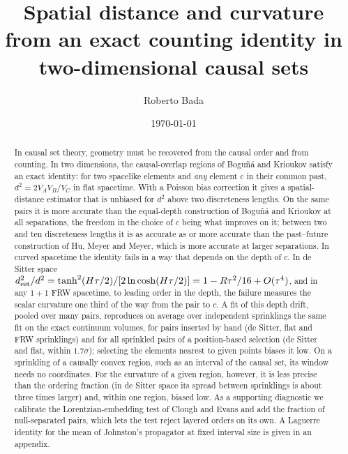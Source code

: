 \documentclass[prd,twocolumn,superscriptaddress,nofootinbib,amsmath,amssymb,floatfix]{revtex4-2}
\begin{document}
\title{Spatial distance and curvature from an exact counting identity in two-dimensional causal sets}

\author{Roberto Bada}

\date{\today}

\begin{abstract}
In causal set theory, geometry must be recovered from the causal order and from counting. In two dimensions, the causal-overlap regions of Bogu\~n\'a and Krioukov satisfy an exact identity: for two spacelike elements and \emph{any} element $c$ in their common past, $d^2=2V_AV_B/V_C$ in flat spacetime. With a Poisson bias correction it gives a spatial-distance estimator that is unbiased for $d^2$ above two discreteness lengths. On the same pairs it is more accurate than the equal-depth construction of Bogu\~n\'a and Krioukov at all separations, the freedom in the choice of $c$ being what improves on it; between two and ten discreteness lengths it is as accurate as or more accurate than the past--future construction of Hu, Meyer and Meyer, which is more accurate at larger separations. In curved spacetime the identity fails in a way that depends on the depth of $c$. In de Sitter space $d^2_{\rm est}/d^2=\tanh^2(H\tau/2)/[2\ln\cosh(H\tau/2)]=1-R\tau^2/16+O(\tau^4)$, and in any $1+1$ FRW spacetime, to leading order in the depth, the failure measures the scalar curvature one third of the way from the pair to $c$. A fit of this depth drift, pooled over many pairs, reproduces on average over independent sprinklings the same fit on the exact continuum volumes, for pairs inserted by hand (de Sitter, flat and FRW sprinklings) and for all sprinkled pairs of a position-based selection (de Sitter and flat, within $1.7\sigma$); selecting the elements nearest to given points biases it low. On a sprinkling of a causally convex region, such as an interval of the causal set, its window needs no coordinates. For the curvature of a given region, however, it is less precise than the ordering fraction (in de Sitter space its spread between sprinklings is about three times larger) and, within one region, biased low. As a supporting diagnostic we calibrate the Lorentzian-embedding test of Clough and Evans and add the fraction of null-separated pairs, which lets the test reject layered orders on its own. A Laguerre identity for the mean of Johnston's propagator at fixed interval size is given in an appendix.
\end{abstract}
\end{document}
